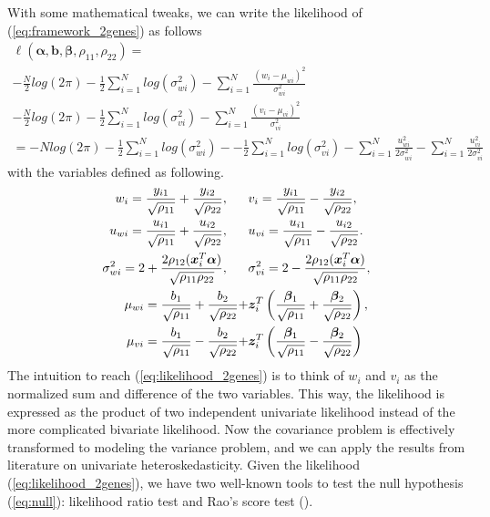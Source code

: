 \documentclass[aap,authoryear, preprint]{imsart}
\numberwithin{equation}{section}
\theoremstyle{plain}
\begin{document}
With some mathematical tweaks, we can write the likelihood of (\ref{eq:framework_2genes}) as follows
\begin{equation}
\begin{multlined}
\ell(\bm{\alpha}, \bm{b}, \bm{\beta}, \rho_{11}, \rho_{22}) = \\
-\frac{N}{2} log(2\pi) - \frac{1}{2} \sum_{i=1}^{N} log (\sigma_{wi}^2) - \sum_{i=1}^{N} \frac{(w_i - \mu_{wi})^2}{\sigma_{wi}^2}\\
-\frac{N}{2} log(2\pi) - \frac{1}{2} \sum_{i=1}^{N} log (\sigma_{vi}^2) - \sum_{i=1}^{N} \frac{(v_i - \mu_{vi})^2}{\sigma_{vi}^2}\\
= -Nlog(2\pi) - \frac{1}{2} \sum_{i=1}^{N}log(\sigma_{wi}^2) - - \frac{1}{2} \sum_{i=1}^{N} log(\sigma_{vi}^2) - \sum_{i=1}^{N} \frac{u_{wi}^2}{2\sigma_{wi}^2} - \sum_{i=1}^{N} \frac{u_{vi}^2}{2\sigma_{vi}^2}
\end{multlined}
    \label{eq:likelihood_2genes}
\end{equation}
with the variables defined as following.
\begin{align*}
w_i = \frac{y_{i1}}{\sqrt{\rho_{11}}} + \frac{y_{i2}}{\sqrt{\rho_{22}}}, 
\hspace{6mm} &
v_i = \frac{y_{i1}}{\sqrt{\rho_{11}}} - \frac{y_{i2}}{\sqrt{\rho_{22}}},\\
u_{wi} = \frac{u_{i1}}{\sqrt{\rho_{11}}} + \frac{u_{i2}}{\sqrt{\rho_{22}}}, 
\hspace{6mm} &
u_{vi} = \frac{u_{i1}}{\sqrt{\rho_{11}}} - \frac{u_{i2}}{\sqrt{\rho_{22}}}.\\
\sigma_{wi}^2 = 2 + \frac{2\rho_{12}(\bm{x}_i^T \bm{\alpha})}{\sqrt{\rho_{11}\rho_{22}}}, \hspace{6mm}&
\sigma_{vi}^2 = 2 - \frac{2\rho_{12}(\bm{x}_i^T \bm{\alpha})}{\sqrt{\rho_{11}\rho_{22}}},\\
\mu_{wi} = \frac{{b}_1}{\sqrt{\rho_{11}}} + \frac{{b}_2}{\sqrt{\rho_{22}}} + &\bm{z}_i^T \left(\frac{\bm{\beta}_1}{\sqrt{\rho_{11}}} + \frac{\bm{\beta}_2}{\sqrt{\rho_{22}}}\right),\\
\mu_{vi} = \frac{{b}_1}{\sqrt{\rho_{11}}} - \frac{{b}_2}{\sqrt{\rho_{22}}} + &\bm{z}_i^T \left(\frac{\bm{\beta}_1}{\sqrt{\rho_{11}}} - \frac{\bm{\beta}_2}{\sqrt{\rho_{22}}}\right)
\end{align*}
The intuition to reach (\ref{eq:likelihood_2genes}) is to think of $w_i$ and $v_i$ as the normalized sum and difference of the two variables. This way, the likelihood is expressed as the product of two independent univariate likelihood instead of the more complicated bivariate likelihood. Now the covariance problem is effectively transformed to modeling the variance problem, and we can apply the results from literature on univariate heteroskedasticity. Given the likelihood (\ref{eq:likelihood_2genes}), we have two well-known tools to test the null hypothesis (\ref{eq:null}): likelihood ratio test and Rao's score test (\cite{breusch1979simple}). \\
\end{document}
